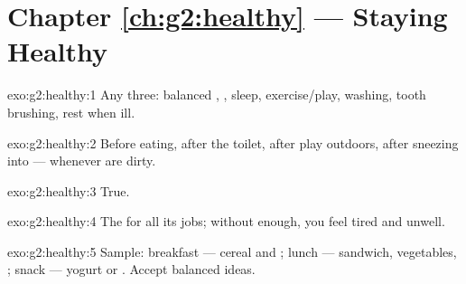 \section*{Chapter \ref{ch:g2:healthy} --- Staying Healthy}

\begin{solution}{exo:g2:healthy:1}
Any three: balanced , , sleep, exercise/play,  washing,
tooth brushing, rest when ill.
\end{solution}

\begin{solution}{exo:g2:healthy:2}
Before eating, after the toilet, after play outdoors, after
sneezing into  --- whenever  are dirty.
\end{solution}

\begin{solution}{exo:g2:healthy:3}
True.
\end{solution}

\begin{solution}{exo:g2:healthy:4}
The    for all its jobs; without enough, you feel
tired and unwell.
\end{solution}

\begin{solution}{exo:g2:healthy:5}
Sample: breakfast --- cereal and ; lunch --- sandwich,
vegetables, ; snack --- yogurt or . Accept balanced
ideas.
\end{solution}

